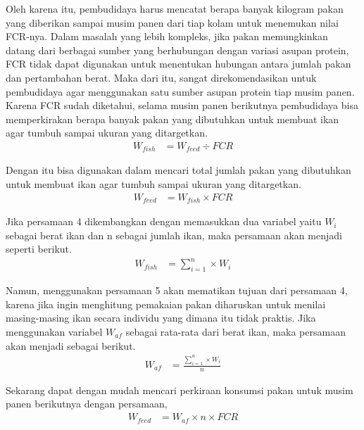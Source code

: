 Oleh karena itu, pembudidaya harus mencatat berapa banyak kilogram pakan yang diberikan sampai musim panen dari tiap kolam untuk menemukan nilai FCR-nya. Dalam masalah yang lebih kompleks, jika pakan memungkinkan datang dari berbagai sumber yang berhubungan dengan variasi asupan protein, FCR tidak dapat digunakan untuk menentukan hubungan antara jumlah pakan dan pertambahan berat.  Maka dari itu, sangat direkomendasikan untuk pembudidaya agar menggunakan satu sumber asupan protein tiap musim panen. Karena FCR sudah diketahui, selama musim panen berikutnya pembudidaya bisa memperkirakan berapa banyak pakan yang dibutuhkan untuk membuat ikan agar tumbuh sampai ukuran yang ditargetkan.
\begin{equation}
    \begin{split}
		W_{fish}
		&= W_{feed} \div FCR
    \end{split}
\end{equation}

Dengan itu bisa digunakan dalam mencari total jumlah pakan yang dibutuhkan untuk membuat ikan agar tumbuh sampai ukuran yang ditargetkan. 
\begin{equation}
    \begin{split}
		W_{feed}
		&= W_{fish} \times FCR
    \end{split}
\end{equation}

Jika persamaan 4 dikembangkan dengan memasukkan dua variabel yaitu $W_i$ sebagai berat ikan dan n sebagai jumlah ikan, maka persamaan akan menjadi seperti berikut.
\begin{equation}
    \begin{split}
		W_{fish}
		&= \sum_{i=1}^n \times W_i
    \end{split}
\end{equation}

Namun, menggunakan persamaan 5 akan mematikan tujuan dari persamaan 4, karena jika ingin menghitung pemakaian pakan diharuskan untuk menilai masing-masing ikan secara individu yang dimana itu tidak praktis. Jika menggunakan variabel $W_{af}$ sebagai rata-rata dari berat ikan, maka persamaan akan menjadi sebagai berikut.
\begin{equation}
    \begin{split}
		W_{af}
		&= \frac{\sum_{i=1}^n \times W_i}{n}
    \end{split}
\end{equation}

Sekarang dapat dengan mudah mencari perkiraan konsumsi pakan untuk musim panen berikutnya dengan persamaan,
\begin{equation}
    \begin{split}
		W_{feed}
		&= W_{af} \times n \times FCR
    \end{split}
\end{equation}


